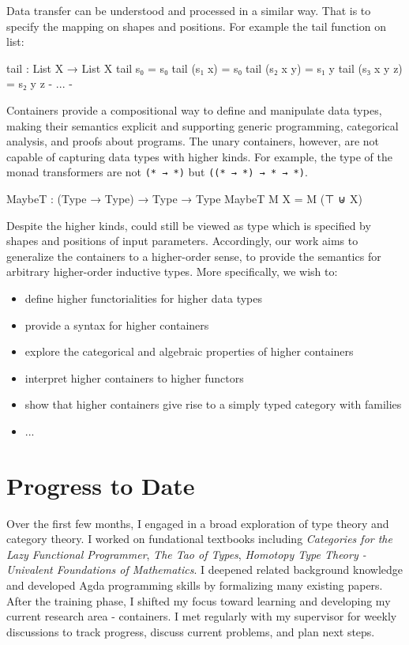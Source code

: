Data transfer can be understood and processed in a similar way. That is to specify the mapping on shapes and positions. For example the tail function on list:

\begin{code}
tail : List X → List X
tail s₀ = s₀
tail (s₁ x) = s₀
tail (s₂ x y) = s₁ y
tail (s₃ x y z) = s₂ y z
{- ... -}
\end{code}

Containers provide a compositional way to define and manipulate data types, making their semantics explicit and supporting generic programming, categorical analysis, and proofs about programs. The unary containers, however, are not capable of capturing data types with higher kinds. For example, the type of the monad transformers\cite{liang1995monad} are not \texttt{(* → *)} but \texttt{((* → *) → * → *)}.

\begin{code}
MaybeT : (Type → Type) → Type → Type
MaybeT M X = M (⊤ ⊎ X)
\end{code}

Despite the higher kinds,  could still be viewed as type which is specified by shapes and positions of input parameters. Accordingly, our work aims to generalize the containers to a higher-order sense, to provide the semantics for arbitrary higher-order inductive types. More specifically, we wish to:

\begin{itemize}
  \item{define higher functorialities for higher data types}
  \item{provide a syntax for higher containers}
  \item{explore the categorical and algebraic properties of higher containers}
  \item{interpret higher containers to higher functors}
  \item{show that higher containers give rise to a simply typed category with families}
  \item{...}
\end{itemize}

\section{Progress to Date}

Over the first few months, I engaged in a broad exploration of type theory and category theory. I worked on fundational textbooks including \textit{Categories for the Lazy Functional Programmer}\cite{altenkirch2024categories}, \textit{The Tao of Types}\cite{altenkirch2021types}, \textit{Homotopy Type Theory - Univalent Foundations of Mathematics}\cite{program2013homotopy}. I deepened related background knowledge and developed Agda programming skills by formalizing many existing papers. After the training phase, I shifted my focus toward learning and developing my current research area - containers. I met regularly with my supervisor for weekly discussions to track progress, discuss current problems, and plan next steps.


